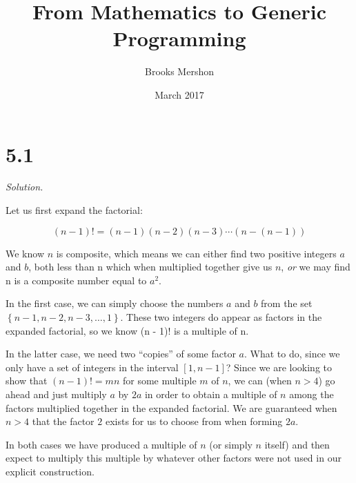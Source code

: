 \documentclass{article}
\title{From Mathematics to Generic Programming}
\author{Brooks Mershon}
\date{March 2017}
\begin{document}
\maketitle

\section*{5.1}

\textit{Solution.}

Let us first expand the factorial:

$$(n - 1)! = (n - 1)(n - 2)(n - 3) \dotsm (n - (n - 1)) $$

We know $n$ is composite, which means we can either find two positive integers $a$ and $b$, both less than n which when multiplied together give us  $n$, \textit{or} we may find n is a composite number equal to $a^2$.

In the first case, we can simply choose the numbers $a$ and $b$ from the set $\left\{n-1, n-2, n-3, \dots, 1\right\}$. These two integers do appear as factors in the expanded factorial, so we know (n - 1)! is a multiple of n.

In the latter case, we need two ``copies'' of some factor $a$. What to do, since we only have a set of integers in the interval $\left[1, n - 1\right]$? Since we are looking to show that $(n - 1)! = mn$ for some multiple $m$ of $n$, we can (when $n > 4$) go ahead and just multiply $a$ by $2a$ in order to obtain a multiple of $n$ among the factors multiplied together in the expanded factorial. We are guaranteed when $n > 4$ that the factor $2$ exists for us to choose from when forming $2a$.

In both cases we have produced a multiple of $n$ (or simply $n$ itself) and then expect to multiply this multiple by whatever other factors were not used in our explicit construction.
\end{document}
